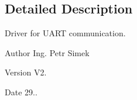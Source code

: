 \subsection{Detailed Description}
Driver for U\+A\+RT communication. 

\begin{DoxyAuthor}{Author}
Ing. Petr Simek 
\end{DoxyAuthor}
\begin{DoxyVersion}{Version}
V2. 
\end{DoxyVersion}
\begin{DoxyDate}{Date}
29.. 
\end{DoxyDate}
